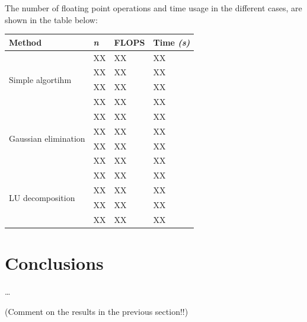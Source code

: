 \documentclass{article}
\begin{document}
\begin{multicols}{2}
The number of floating point operations and time usage in the different cases, are shown in the table below:


\begin{center}
    \begin{tabular}{| l | l | l | l |} \hline
    \textbf{Method} 					&\textbf{\textit{n}} 	&\textbf{FLOPS} 	&\textbf{Time \textit{(s)}} \\ \hline
    \multirow{4}{*}{Simple algortihm} 		& XX 			& XX				& XX \\ 
    								& XX 			& XX 			& XX \\
    								& XX				& XX 			& XX \\ 
								& XX				& XX 			& XX \\ \hline
								
    \multirow{4}{*}{Gaussian elimination} 	& XX 			& XX				& XX \\ 
    								& XX 			& XX 			& XX \\
    								& XX				& XX 			& XX \\ 
								& XX				& XX 			& XX \\ \hline

    \multirow{4}{*}{LU decomposition} 		& XX 			& XX				& XX \\ 
    								& XX 			& XX 			& XX \\
    								& XX				& XX 			& XX \\ 
								& XX				& XX 			& XX \\ \hline
																
    \end{tabular}
\end{center}


\section{Conclusions} \label{sec:conclusions}
\dots

(Comment on the results in the previous section!!)

\end{multicols}
\end{document}
